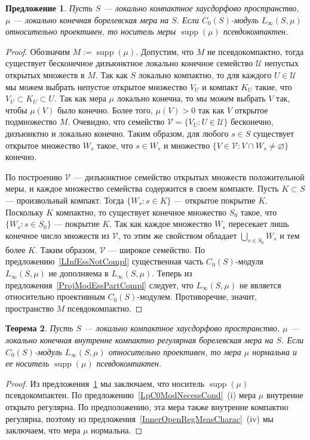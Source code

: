 \documentclass[12pt]{article}
\newtheorem{theorem}{Теорема}[section]
\newtheorem{proposition}[theorem]{Предложение}
\begin{document}
\begin{proposition}\label{LInfRelProjSuppCond} Пусть $S$ --- локально компактное
    хаусдорфово пространство, $\mu$ --- локально конечная борелевская мера на
    $S$. Если $C_0(S)$-модуль $L_\infty(S,\mu)$ относительно проективен, то
    носитель меры $\operatorname{supp}(\mu)$ псевдокомпактен.
\end{proposition}
\begin{proof} Обозначим $M:=\operatorname{supp}(\mu)$. Допустим, что $M$ не
    псевдокомпактно, тогда существует бесконечное дизъюнктное локально конечное
    семейство $\mathcal{U}$ непустых открытых множеств в $M$. Так как $S$
    локально компактно, то для каждого $U\in\mathcal{U}$ мы можем выбрать
    непустое открытое множество $V_U$ и компакт $K_U$ такие, что $V_U\subset
        K_U\subset  U$. Так как мера $\mu$ локально конечна, то мы можем выбрать $V$
    так, чтобы $\mu(V)$ было конечно. Более того, $\mu(V)>0$ так как $V$
    открытое подмножество $M$. Очевидно, что семейство
    $\mathcal{V}=\{V_U:U\in\mathcal{U}\}$ бесконечно, дизъюнктно и локально
    конечно. Таким образом, для любого $s\in S$ существует открытое множество
    $W_s$ такое, что $s\in W_s$ и множество $\{V\in\mathcal{V}: V\cap
        W_s\neq\varnothing \}$ конечно.

    По построению $\mathcal{V}$ --- дизъюнктное семейство открытых множеств
    положительной меры, и каждое множество семейства содержится в своем
    компакте. Пусть $K\subset S$ --- произвольный компакт. Тогда $\{W_s:s\in
        K\}$ --- открытое покрытие $K$. Поскольку $K$ компактно, то существует
    конечное множество $S_0$ такое, что $\{W_s:s\in S_0\}$ --- покрытие $K$. Так
    как каждое множество $W_s$ пересекает лишь конечное число множеств из
    $\mathcal{V}$, то этим же свойством обладает $\bigcup_{s\in S_0}W_s$ и тем
    более $K$. Таким образом, $\mathcal{V}$ --- широкое семейство. По
    предложению~\ref{LInfEssNotCompl} существенная часть $C_0(S)$-модуля
    $L_\infty(S,\mu)$ не дополняема в $L_\infty(S,\mu)$. Теперь из
    предложения~\ref{ProjModEssPartCompl} следует, что $L_\infty(S,\mu)$ не
    является относительно проективным $C_0(S)$-модулем. Противоречие, значит,
    пространство $M$ псевдокомпактно.
\end{proof}

\begin{theorem}\label{LInfReProjNecessCond} Пусть $S$ --- локально компактное
    хаусдорфово пространство, $\mu$ --- локально конечная внутренне компактно
    регулярная борелевская мера на $S$. Если $C_0(S)$-модуль $L_\infty(S,\mu)$
    относительно проективен, то мера $\mu$ нормальна и ее
    носитель $\operatorname{supp}(\mu)$ псевдокомпактен.

\end{theorem}
\begin{proof} Из предложения~\ref{LInfRelProjSuppCond} мы заключаем, 
    что носитель $\operatorname{supp}(\mu)$ псевдокомпактен. По 
    предложению~\ref{LpC0ModNecessCond}~(i) мера $\mu$ внутренне открыто 
    регулярна. По предположению, эта мера также внутренне компактно регулярна, 
    поэтому из предложения~\ref{InnerOpenRegMeasCharac}~(iv) мы заключаем, что
    мера $\mu$ нормальна.
\end{proof}
\end{document}
